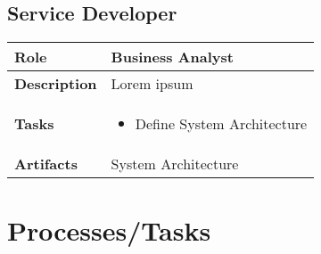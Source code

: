 \subsection{Service Developer}
 \label{table:ch6_Role_Service_Developer}
\begin{tabular}
	{|m{2cm}|m{10cm}|} \hline \bfseries Role & Business Analyst\\
	\hline \bfseries Description & Lorem ipsum\\
	\hline \bfseries Tasks & 
	\begin{itemize}
		\item Define System Architecture 
	\end{itemize}
	\\
	\hline \bfseries Artifacts & System Architecture\\
	\hline 
\end{tabular}

\section{Processes/Tasks} 

